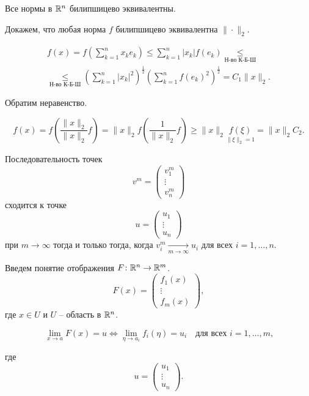 	\begin{theorem}
		Все нормы в $\mathbb{R} ^n$ билипшицево эквивалентны.
	\end{theorem}
	\begin{Proof}
		Докажем, что любая норма $f$ билипшицево эквивалентна $\|\cdot\|_2$.
		
		\begin{multline*}
			f(x) = f\left(\sum\limits_{k=1}^n x_k e_k\right) \le \sum\limits_{k=1}^n |x_k| f(e_k) \underset{\text{Н-во К-Б-Ш}}{\le}\\ 
			\underset{\text{Н-во К-Б-Ш}}{\le}\left(\sum\limits_{k=1}^n |x_k|^2 \right)^{\frac 1 2} \left( \sum\limits_{k=1}^n f(e_k) ^ 2 \right)^{\frac 1 2} = C_1 \|x\|_2.
		\end{multline*}
		
		Обратим неравенство.
		
		$$
			f(x) = f\left(\frac {\|x\|_2} {\|x\|_2} f\right) = {\|x\|_2} f\left(\frac 1 {\|x\|_2} f\right) \ge {\|x\|_2} \underset{\|\xi\|_2 = 1}{f(\xi)} = {\|x\|_2} C_2.
		$$
	\end{Proof}
	\begin{corollary}
		Последовательность точек
		\begin{equation*}
			v^m = \begin{pmatrix}
			v^m_1 \\
			\vdots \\
			v^m_n
			\end{pmatrix}
		\end{equation*}
		сходится к точке 
		\begin{equation*}
			u = \begin{pmatrix}
				u_1 \\
				\vdots \\
				u_n
			\end{pmatrix}
		\end{equation*} 
		при $m\to\infty$ тогда и только тогда, когда $v_i^m \underset{m \to \infty}{\longrightarrow} u_i$ для всех $i=1,\ldots, n$.
	\end{corollary}

	\begin{mdef}
		Введем понятие отображения $F \colon \mathbb{R}^n \to \mathbb{R}^m$.
		$$
			F(x) = 	\begin{pmatrix}
				f_1(x) \\
				\vdots \\
				f_m(x)
			\end{pmatrix},
		$$ где $x \in U$ и $U$ -- область в $\mathbb{R}^n$.
	\end{mdef}
	\begin{corollary}
		$$\lim \limits_{x\to a} F(x) = u \Leftrightarrow \lim\limits_{\eta \to a_i} f_i(\eta) = u_i \quad \text{для всех $i=1,\ldots, m$,} $$
	\end{corollary}
	где 
	$$
		u = \begin{pmatrix}
			u_1\\
			\vdots\\
			u_n
		\end{pmatrix}.
	$$